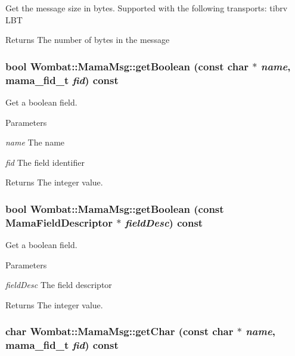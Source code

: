 Get the message size in bytes. Supported with the following transports: tibrv LBT

\begin{DoxyReturn}{Returns}
The number of bytes in the message 
\end{DoxyReturn}
\hypertarget{classWombat_1_1MamaMsg_a112955bcd29cbcf8af160d3f8cda018d}{
\subsubsection[{getBoolean}]{\setlength{\rightskip}{0pt plus 5cm}bool Wombat::MamaMsg::getBoolean (const char $\ast$ {\em name}, \/  mama\_\-fid\_\-t {\em fid}) const}}
\label{classWombat_1_1MamaMsg_a112955bcd29cbcf8af160d3f8cda018d}


Get a boolean field. 
\begin{DoxyParams}{Parameters}
\item[{\em name}]The name \item[{\em fid}]The field identifier \end{DoxyParams}
\begin{DoxyReturn}{Returns}
The integer value. 
\end{DoxyReturn}
\hypertarget{classWombat_1_1MamaMsg_a5a2870c262c77993f68c5684bc34b216}{
\subsubsection[{getBoolean}]{\setlength{\rightskip}{0pt plus 5cm}bool Wombat::MamaMsg::getBoolean (const {\bf MamaFieldDescriptor} $\ast$ {\em fieldDesc}) const}}
\label{classWombat_1_1MamaMsg_a5a2870c262c77993f68c5684bc34b216}


Get a boolean field. 
\begin{DoxyParams}{Parameters}
\item[{\em fieldDesc}]The field descriptor \end{DoxyParams}
\begin{DoxyReturn}{Returns}
The integer value. 
\end{DoxyReturn}
\hypertarget{classWombat_1_1MamaMsg_ad454a523e50013a4e9451000dfc105e5}{
\subsubsection[{getChar}]{\setlength{\rightskip}{0pt plus 5cm}char Wombat::MamaMsg::getChar (const char $\ast$ {\em name}, \/  mama\_\-fid\_\-t {\em fid}) const}}
\label{classWombat_1_1MamaMsg_ad454a523e50013a4e9451000dfc105e5}


